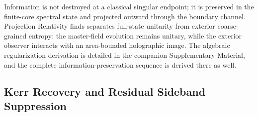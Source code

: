 \documentclass[11pt]{article}
\begin{document}
Information is not destroyed \cite{hawking_penrose_1970} at a classical singular 
endpoint; it is preserved in the finite-core spectral state and projected outward 
through the boundary channel. Projection Relativity finds separates full-state 
unitarity from exterior coarse-grained entropy: the master-field evolution 
remains unitary, while the exterior observer interacts with an area-bounded 
holographic image. The algebraic regularization derivation is detailed in the 
companion Supplementary Material, and the complete information-preservation 
sequence is derived there as well.

\subsection{Kerr Recovery and Residual Sideband Suppression}
\label{sec:kerr_recovery_and_suppression}
\end{document}
